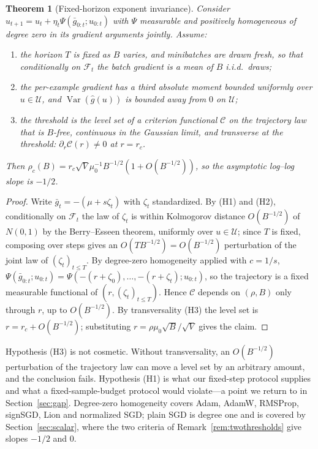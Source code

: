 \documentclass{article}
\theoremstyle{plain}
\newtheorem{theorem}{Theorem}
\theoremstyle{definition}
\theoremstyle{remark}
\newcommand{\Var}{\operatorname{Var}}
\newcommand{\1}{\mathbf{1}}
\newcommand{\cU}{\mathcal{U}}
\newcommand{\cF}{\mathcal{F}}
\begin{document}
\begin{theorem}[Fixed-horizon exponent invariance]
\label{thm:noexp}
Consider $u_{t+1} = u_t + \eta_t\Psi(\bar g_{0:t}; u_{0:t})$ with $\Psi$
measurable and positively homogeneous of degree zero in its gradient arguments
jointly. Assume:
\begin{enumerate}[leftmargin=*,itemsep=1pt,label=(H\arabic*)]
\item the horizon $T$ is fixed as $B$ varies, and minibatches are drawn fresh, so
that conditionally on $\cF_t$ the batch gradient is a mean of $B$ i.i.d.\ draws;
\item the per-example gradient has a third absolute moment bounded uniformly over
$u\in\cU$, and $\Var(\hat g(u))$ is bounded away from $0$ on $\cU$;
\item the threshold is the level set of a criterion functional $\mathcal C$ on
the trajectory law that is $B$-free, continuous in the Gaussian limit, and
\emph{transverse} at the threshold: $\partial_r\mathcal C(r)\ne0$ at $r = r_c$.
\end{enumerate}
Then $\rho_c(B) = r_c\sqrt V\mu_0^{-1}B^{-1/2}(1+O(B^{-1/2}))$, so the asymptotic
log--log slope is $-1/2$.
\end{theorem}

\begin{proof}
Write $\bar g_t = -(\mu+s\zeta_t)$ with $\zeta_t$ standardized. By (H1) and (H2),
conditionally on $\cF_t$ the law of $\zeta_t$ is within Kolmogorov distance
$O(B^{-1/2})$ of $N(0,1)$ by the Berry--Esseen theorem, uniformly over
$u\in\cU$; since $T$ is fixed, composing over steps gives an
$O(TB^{-1/2}) = O(B^{-1/2})$ perturbation of the joint law of
$(\zeta_t)_{t\le T}$. By degree-zero homogeneity applied with $c = 1/s$,
$\Psi(\bar g_{0:t};u_{0:t}) = \Psi(-(r+\zeta_0),\dots,-(r+\zeta_t);u_{0:t})$, so
the trajectory is a fixed measurable functional of $(r,(\zeta_t)_{t\le T})$.
Hence $\mathcal C$ depends on $(\rho,B)$ only through $r$, up to $O(B^{-1/2})$.
By transversality (H3) the level set is $r = r_c + O(B^{-1/2})$; substituting
$r = \rho\mu_0\sqrt B/\sqrt V$ gives the claim.
\end{proof}

Hypothesis (H3) is not cosmetic. Without transversality, an $O(B^{-1/2})$
perturbation of the trajectory law can move a level set by an arbitrary amount,
and the conclusion fails. Hypothesis (H1) is what our fixed-step protocol
supplies and what a fixed-sample-budget protocol would violate---a point we
return to in Section~\ref{sec:gap}. Degree-zero homogeneity covers Adam, AdamW,
RMSProp, signSGD, Lion and normalized SGD; plain SGD is degree one and is covered
by Section~\ref{sec:scalar}, where the two criteria of
Remark~\ref{rem:twothresholds} give slopes $-1/2$ and $0$.
\end{document}
